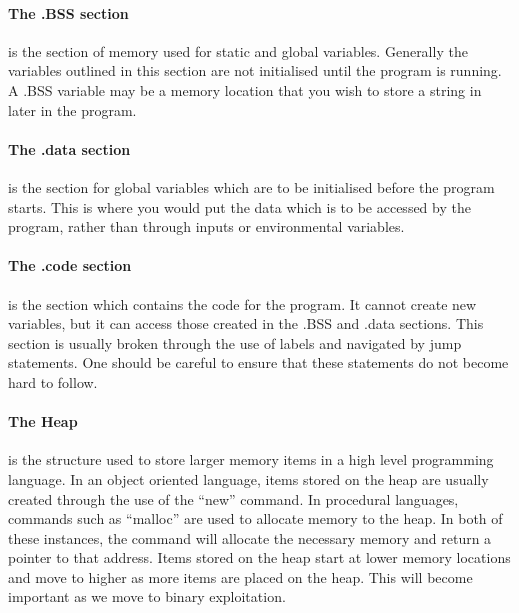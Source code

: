 \documentclass[a4paper,11pt]{article}
\begin{document}
					\paragraph{The .BSS section}
						is the section of memory used for static and global variables. 
						Generally the variables outlined in this section are not initialised until the program is running. 
						A .BSS variable may be a memory location that you wish to store a string in later in the program. 
					\paragraph{The .data section}
						is the section for global variables which are to be initialised before the program starts. 
						This is where you would put the data which is to be accessed by the program, rather than through inputs or environmental variables. 
					\paragraph{The .code section}
						is the section which contains the code for the program. 
						It cannot create new variables, but it can access those created in the .BSS and .data sections. 
						This section is usually broken through the use of labels and navigated by jump statements. 
						One should be careful to ensure that these statements do not become hard to follow. 
					\paragraph{The Heap}
						is the structure used to store larger memory items in a high level programming language. 
						In an object oriented language, items stored on the heap are usually created through the use of the ``new'' command. 
						In procedural languages, commands such as ``malloc'' are used to allocate memory to the heap. 
						In both of these instances, the command will allocate the necessary memory and return a pointer to that address. 
						Items stored on the heap start at lower memory locations and move to higher as more items are placed on the heap. 
						This will become important as we move to binary exploitation. 
\end{document}
